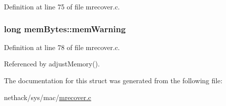 Definition at line 75 of file mrecover.\+c.

\hypertarget{structmemBytes_aa70378a6b78906797c4b1ed499ee9c38}{
\subsubsection[{mem\+Warning}]{\setlength{\rightskip}{0pt plus 5cm}long mem\+Bytes\+::mem\+Warning}}\label{structmemBytes_aa70378a6b78906797c4b1ed499ee9c38}


Definition at line 78 of file mrecover.\+c.



Referenced by adjust\+Memory().



The documentation for this struct was generated from the following file\+:\begin{DoxyCompactItemize}
\item 
nethack/sys/mac/\hyperlink{mrecover_8c}{mrecover.\+c}\end{DoxyCompactItemize}
